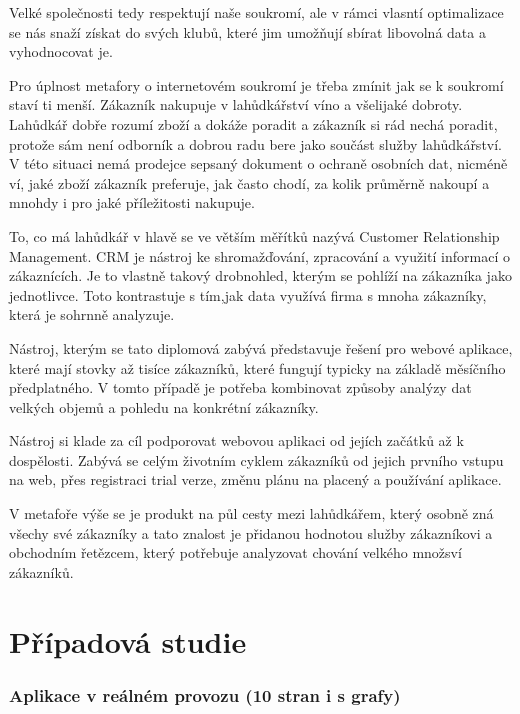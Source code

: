 \documentclass[bc,female,java,dept456]{diploma}						%
\begin{document}
Velké společnosti tedy respektují naše soukromí, ale v rámci vlasntí optimalizace se nás snaží získat do svých klubů, které jim umožňují sbírat libovolná data a vyhodnocovat je.

Pro úplnost metafory o internetovém soukromí je třeba zmínit jak se k soukromí staví ti menší. Zákazník nakupuje v lahůdkářství víno a všelijaké dobroty. Lahůdkář dobře rozumí zboží a dokáže poradit a zákazník si rád nechá poradit,  protože sám není odborník a dobrou radu bere jako součást služby lahůdkářství. V této situaci nemá prodejce sepsaný dokument o ochraně osobních dat, nicméně ví, jaké zboží zákazník preferuje, jak často chodí, za kolik průměrně nakoupí a mnohdy i pro jaké příležitosti nakupuje.

To, co má lahůdkář v hlavě se ve větším měřítků nazývá Customer Relationship Management. CRM je nástroj ke shromažďování, zpracování a využití informací o zákaznících. Je to vlastně takový drobnohled, kterým se pohlíží na zákazníka jako jednotlivce. Toto kontrastuje s tím,jak data využívá firma s mnoha zákazníky, která je sohrnně analyzuje.

\bigskip

Nástroj, kterým se tato diplomová zabývá představuje řešení pro webové aplikace, které mají stovky až tisíce zákazníků, které fungují typicky na základě měsíčního předplatného. V tomto případě je potřeba kombinovat způsoby analýzy dat velkých objemů a pohledu na konkrétní zákazníky. 

Nástroj si klade za cíl podporovat webovou aplikaci od jejích začátků až k dospělosti. Zabývá se celým životním cyklem zákazníků od jejich prvního vstupu na web, přes registraci trial verze, změnu plánu na placený a používání aplikace.

V metafoře výše se je produkt na půl cesty mezi lahůdkářem, který osobně zná všechy své zákazníky a tato znalost je přidanou hodnotou služby zákazníkovi a obchodním řetězcem, který potřebuje analyzovat chování velkého množsví zákazníků.









\section{Případová studie}

\subsubsection{Aplikace v reálném provozu (10 stran i s grafy)}
\end{document}
